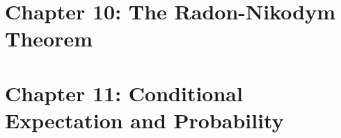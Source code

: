 \documentclass{lecturenotes}
\begin{document}
\newpage
\section*{Chapter 10: The Radon-Nikodym Theorem}


\newpage
\section*{Chapter 11: Conditional Expectation and Probability}

%



%
%
%
%
%
%
%
%
\end{document}
